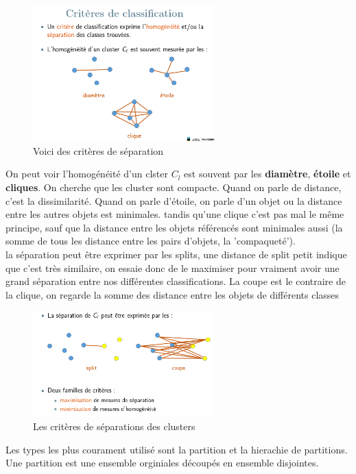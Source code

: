 \documentclass[oneside]{book}
\begin{document}
\begin{figure}[!ht]
\centering
\includegraphics[width = 7cm]{separation.png}
\caption{Voici des critères de séparation}
\label{fig:separation}
\end{figure}

On peut voir l'homogénéité d'un clster $C_l$ est souvent par les \textbf{diamètre}, \textbf{étoile} et \textbf{cliques}.  On cherche que les cluster sont compacte. Quand on parle de distance, c'est la dissimilarité. Quand on parle d'étoile, on parle d'un objet ou la distance entre les autres objets est minimales. tandis qu'une clique c'est pas mal le même principe, sauf que la distance entre les objets référencés sont minimales aussi (la somme de tous les distance entre les pairs d'objets, la 'compaqueté').\\

la séparation peut être exprimer par les splits, une distance de split petit indique que c'est très similaire, on essaie donc de le maximiser pour vraiment avoir une grand séparation entre nos différentes classifications. La coupe est le contraire de la clique, on regarde la somme des distance entre les objets de différents classes\\

\begin{figure}[!ht]
\centering
\includegraphics[width = 7cm]{classification.png}
\caption{Les critères de séparations des clusters}
\label{fig:classification_cluster}
\end{figure}

Les types les plus courament utilisé sont la partition et la hierachie de partitions. Une partition est une ensemble orginiales découpés en ensemble disjointes. \\
\end{document}
